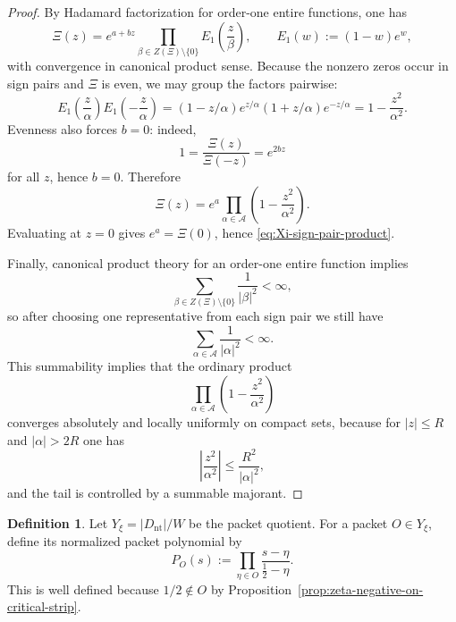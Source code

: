 \documentclass[11pt,a4paper]{article}
\numberwithin{equation}{section}
\theoremstyle{definition}
\newtheorem{definition}[theorem]{Definition}
\theoremstyle{remark}
\begin{document}
\begin{proof}
By Hadamard factorization for order-one entire functions, one has
\[
\Xi(z)=e^{a+bz}\prod_{\beta\in Z(\Xi)\setminus\{0\}} E_1\!\left(\frac{z}{\beta}\right),
\qquad
E_1(w):=(1-w)e^w,
\]
with convergence in canonical product sense.  Because the nonzero zeros occur in sign pairs and $\Xi$ is even, we may group the factors pairwise:
\[
E_1\!\left(\frac{z}{\alpha}\right)E_1\!\left(-\frac{z}{\alpha}\right)
=(1-z/\alpha)e^{z/\alpha}(1+z/\alpha)e^{-z/\alpha}
=1-\frac{z^2}{\alpha^2}.
\]
Evenness also forces $b=0$: indeed,
\[
1=\frac{\Xi(z)}{\Xi(-z)}=e^{2bz}
\]
for all $z$, hence $b=0$.  Therefore
\[
\Xi(z)=e^a\prod_{\alpha\in\mathcal A}\left(1-\frac{z^2}{\alpha^2}\right).
\]
Evaluating at $z=0$ gives $e^a=\Xi(0)$, hence \eqref{eq:Xi-sign-pair-product}.

Finally, canonical product theory for an order-one entire function implies
\[
\sum_{\beta\in Z(\Xi)\setminus\{0\}} \frac{1}{|\beta|^2}<\infty,
\]
so after choosing one representative from each sign pair we still have
\[
\sum_{\alpha\in\mathcal A}\frac{1}{|\alpha|^2}<\infty.
\]
This summability implies that the ordinary product
\[
\prod_{\alpha\in\mathcal A}\left(1-\frac{z^2}{\alpha^2}\right)
\]
converges absolutely and locally uniformly on compact sets, because for $|z|\le R$ and $|\alpha|>2R$ one has
\[
\left|\frac{z^2}{\alpha^2}\right|\le \frac{R^2}{|\alpha|^2},
\]
and the tail is controlled by a summable majorant.
\end{proof}

\begin{definition}\label{def:packet-polynomial}
Let $Y_\xi=|D_{\mathrm{nt}}|/W$ be the packet quotient.  For a packet $O\in Y_\xi$, define its normalized packet polynomial by
\begin{equation}\label{eq:packet-polynomial-def}
P_O(s):=\prod_{\eta\in O}\frac{s-\eta}{\frac12-\eta}.
\end{equation}
This is well defined because $1/2\notin O$ by Proposition~\ref{prop:zeta-negative-on-critical-strip}.
\end{definition}
\end{document}
